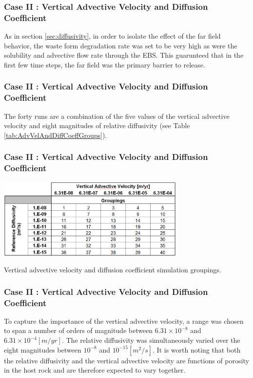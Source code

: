 \begin{frame}[c]
  \frametitle{Case II : Vertical Advective Velocity and Diffusion Coefficient}

As in section \ref{sec:diffusivity}, in order to isolate the effect of the far 
field behavior, the waste form degradation rate was set to be very high as were 
the solubility and advective flow rate through the  \gls{EBS}. This guarunteed 
that in the first few time steps, the far field was the primary barrier to 
release. 
\end{frame}

\begin{frame}[c]
  \frametitle{Case II : Vertical Advective Velocity and Diffusion Coefficient}


The forty runs are a combination of the five values of the vertical advective 
velocity and eight magnitudes of relative diffusivity (see Table 
\ref{tab:AdvVelAndDiffCoeffGroups}). 
\end{frame}

\begin{frame}[c]
  \frametitle{Case II : Vertical Advective Velocity and Diffusion Coefficient}

\begin{table}[hbp!]
\centering
\includegraphics[width=0.7\textwidth]{AdvVelAndDiffCoeffEBSFail/AdvVelAndDiffCoeffGroups.eps}
\caption{Vertical advective velocity and diffusion coefficient simulation groupings.}
\label{tab:AdvVelAndDiffCoeffGroups}
\end{table}
\end{frame}


\begin{frame}[c]
  \frametitle{Case II : Vertical Advective Velocity and Diffusion Coefficient}
To capture the importance of the vertical advective velocity, a range was chosen 
to span a number of orders of magnitude between $ 6.31\times 10^{-8}$ 
and $ 6.31\times10^{-4} [m/yr]$. The relative diffusivity was simultaneously varied 
over the eight magnitudes between $ 10^{-8}$ and $ 10^{-15} [m^2/s]$. It is 
worth noting that both the relative diffusivity and the vertical advective 
velocity are functions of porosity in the host rock and are therefore expected 
to vary together. 


\end{frame}

